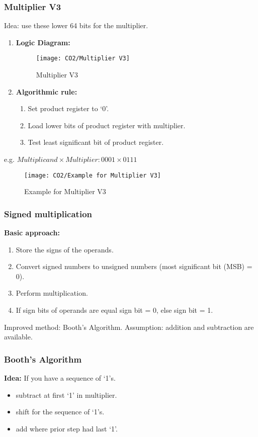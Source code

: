 \subsubsection{Multiplier V3}
Idea: use these lower 64 bits for the multiplier. 
\begin{enumerate}
    \item \textbf{Logic Diagram:}
    \begin{figure}[H]
        \centering
        \texttt{[image: CO2/Multiplier V3]}
        \caption{Multiplier V3}
    \end{figure}
    
    \item \textbf{Algorithmic rule:}
    \begin{enumerate}
        \item Set product register to `0'. 
        \item Load lower bits of product register with multiplier. 
        \item Test least significant bit of product register. 
    \end{enumerate} 
\end{enumerate}

e.g. $Multiplicand \times Multiplier: 0001\times 0111$
\begin{figure}[H]
    \centering
    \texttt{[image: CO2/Example for Multiplier V3]}
    \caption{Example for Multiplier V3}
\end{figure}


\subsubsection{Signed multiplication}
\textbf{Basic approach:}
\begin{enumerate}
    \item Store the signs of the operands. 
    \item Convert signed numbers to unsigned numbers
    (most significant bit (MSB) = 0). 
    \item Perform multiplication.
    \item If sign bits of operands are equal sign bit = 0, else sign bit = 1. 
\end{enumerate}

Improved method: Booth's Algorithm. Assumption: addition and subtraction are available. 

\subsubsection{Booth's Algorithm}
\textbf{Idea:} If you have a sequence of `1's. 
\begin{itemize}
    \item subtract at first `1' in multiplier. 
    \item shift for the sequence of `1's. 
    \item add where prior step had last `1'. 
\end{itemize}

